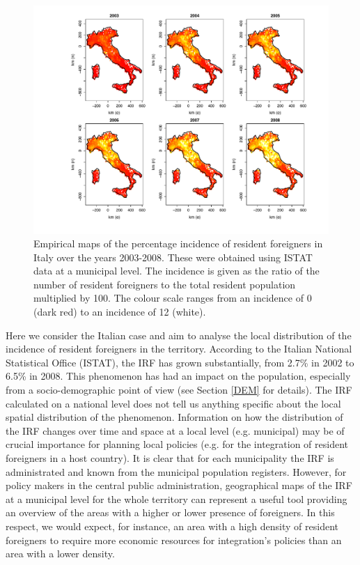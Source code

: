 \begin{figure}[tbp]
	\centering
		\includegraphics[width=\textwidth]{it/Raw}
	\caption{Empirical maps of the percentage incidence of resident foreigners in Italy over the years 2003-2008. These were obtained using ISTAT data at a municipal level.	The incidence is given as the ratio of the number of resident foreigners to the total resident population multiplied by 100. The colour scale ranges from an incidence of 0 (dark red) to an incidence of 12 (white).}
	\label{Rd}
\end{figure}

Here we consider the Italian case and aim to analyse the local distribution of the incidence of resident foreigners in the territory. According to the Italian National Statistical Office (ISTAT), the IRF has grown substantially, from 2.7\% in 2002 to 6.5\% in 2008. This phenomenon has had an impact on the population, especially from a socio-demographic point of view (see Section \ref{DEM} for details). The IRF calculated on a national level does not tell us anything specific about the local spatial distribution of the phenomenon. Information on how the distribution of the IRF changes over time and space at a local level (e.g. municipal) may be of crucial importance for planning local policies (e.g. for the integration of resident foreigners in a host country). It is clear that for each municipality the IRF is administrated and known from the municipal population registers. However, for policy makers in the central public administration, geographical maps of the IRF at a municipal level for the whole territory can represent a useful tool providing an overview of the areas with a higher or lower presence of foreigners. In this respect, we would expect, for instance, an area with a high density of resident foreigners to require more economic resources for integration's policies than an area with a lower density.

